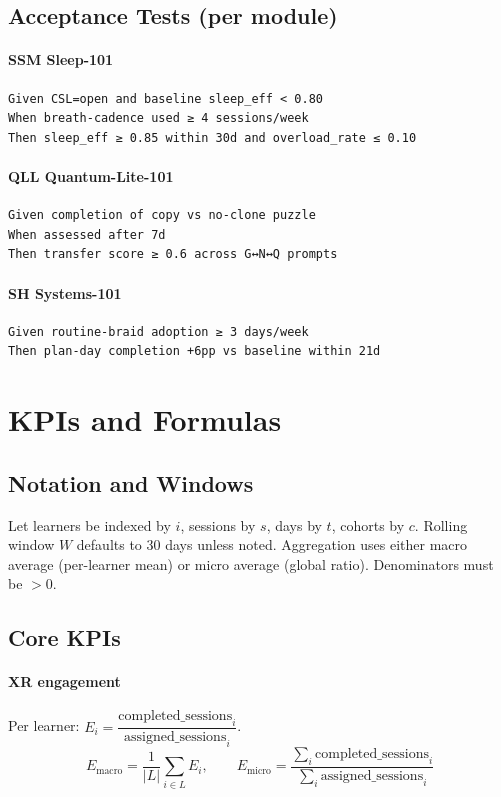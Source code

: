 \documentclass[11pt]{article}
\theoremstyle{plain}
\begin{document}
\subsection{Acceptance Tests (per module)}
\paragraph{SSM Sleep-101}
\begin{verbatim}
Given CSL=open and baseline sleep_eff < 0.80
When breath-cadence used ≥ 4 sessions/week
Then sleep_eff ≥ 0.85 within 30d and overload_rate ≤ 0.10
\end{verbatim}

\paragraph{QLL Quantum-Lite-101}
\begin{verbatim}
Given completion of copy vs no-clone puzzle
When assessed after 7d
Then transfer score ≥ 0.6 across G↔N↔Q prompts
\end{verbatim}

\paragraph{SH Systems-101}
\begin{verbatim}
Given routine-braid adoption ≥ 3 days/week
Then plan-day completion +6pp vs baseline within 21d
\end{verbatim}
\section{KPIs and Formulas}

\subsection{Notation and Windows}
Let learners be indexed by $i$, sessions by $s$, days by $t$, cohorts by $c$. Rolling window $W$ defaults to 30 days unless noted. Aggregation uses either macro average (per-learner mean) or micro average (global ratio). Denominators must be $>0$.

\subsection{Core KPIs}

\paragraph{XR engagement}
Per learner: $E_i=\dfrac{\text{completed\_sessions}_i}{\text{assigned\_sessions}_i}$.
\[
E_{\text{macro}}=\frac{1}{|L|}\sum_{i\in L}E_i,\qquad
E_{\text{micro}}=\frac{\sum_i \text{completed\_sessions}_i}{\sum_i \text{assigned\_sessions}_i}
\]
\end{document}
